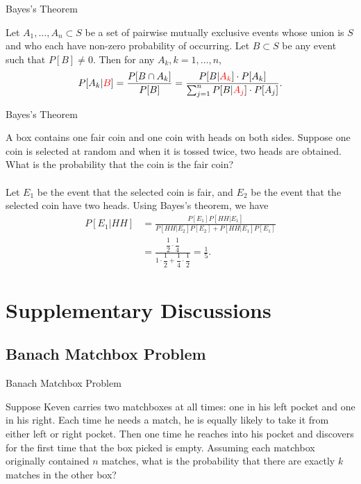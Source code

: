 \begin{frame}{Bayes's Theorem}

\justifying
{} Let $A_1, \ldots, A_n \subset S$ be a set of pairwise mutually exclusive events whose union is $S$ and who each have non-zero probability of occurring. Let $B\subset S$ be any event such that $P[B]\neq 0$. Then for any $A_k, k = 1, \ldots, n$,
\begin{align*}
P[A_k|\red{B}] = \frac{P[B\cap A_k]}{P[B]} = \frac{P[B|\red{A_k}]\cdot P[A_k]}{\sum_{j=1}^n P[B|\red{A_j}] \cdot P[A_j]}.
\end{align*}

\end{frame}

\begin{frame}{Bayes's Theorem}

\justifying
{} A box contains one fair coin and one coin with heads on both sides. Suppose one coin is selected at random and when it is tossed twice, two heads are obtained. What is the probability that the coin is the fair coin?
~\\
~\\
\pause
\justifying
{} Let $E_1$ be the event that the selected coin is fair, and $E_2$ be the event that the selected coin have two heads. Using Bayes's theorem, we have
\begin{align*}
P[E_1|HH] & = \frac{P[E_1]P[HH|E_1]}{P[HH|E_2]P[E_2] + P[HH|E_1]P[E_1]} \\
& = \frac{\dfrac{1}{2}\cdot \dfrac{1}{4}}{1\cdot \dfrac{1}{2} + \dfrac{1}{4}\cdot\dfrac{1}{2}} = \frac{1}{5}.
\end{align*}

\end{frame}

\section{Supplementary Discussions}

\subsection{Banach Matchbox Problem}

\begin{frame}{Banach Matchbox Problem}

\justifying
{} Suppose Keven carries two matchboxes at all times: one in his left pocket and one in his right. Each time he needs a match, he is equally likely to take it from either left or right pocket. Then one time he reaches into his pocket and discovers for the first time that the box picked is empty. Assuming each matchbox originally contained $n$ matches, what is the probability that there are exactly $k$ matches in the other box?


\end{frame}

